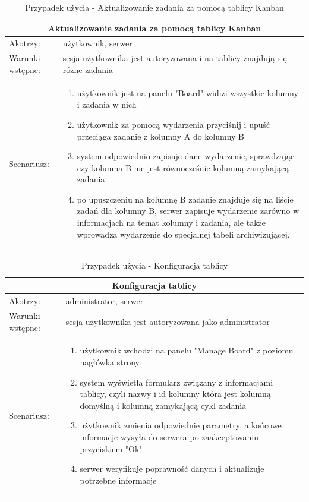 \begin{table}[h!]
	\begin{tabular}{|p{2cm}||p{13cm}|  }
		
		
		
		\hline
		\multicolumn{2}{|c|}{Aktualizowanie zadania za pomocą tablicy Kanban} \\
		\hline
		Akotrzy: & użytkownik, serwer \\
		\hline
		Warunki wstępne: & sesja użytkownika jest autoryzowana i na tablicy znajdują się różne zadania \\
		\hline
		Scenariusz: &
		\begin{enumerate}
			\item użytkownik jest na panelu "Board" widizi wszystkie kolumny i zadania w nich
			\item użytkownik za pomocą wydarzenia przyciśnij i upuść przeciąga zadanie z kolumny A do kolumny B
			\item system odpowiednio zapisuje dane wydarzenie, sprawdzając czy kolumna B nie jest równocześnie kolumną zamykającą zadania
			\item  po upuszczeniu na kolumnę B zadanie znajduje się na liście zadań dla kolumny B, serwer zapisuje wydarzenie zarówno w informacjach na temat kolumny i zadania, ale także wprowadza wydarzenie do specjalnej tabeli archiwizującej.
		\end{enumerate}\\
		\hline
	\end{tabular}
	\caption{Przypadek użycia - Aktualizowanie zadania za pomocą tablicy Kanban}
\end{table}


\begin{table}[h!]
	\begin{tabular}{|p{2cm}||p{13cm}|  }
		
		
		
		\hline
		\multicolumn{2}{|c|}{Konfiguracja tablicy} \\
		\hline
		Akotrzy: & administrator, serwer \\
		\hline
		Warunki wstępne: & sesja użytkownika jest autoryzowana jako administrator  \\
		\hline
		Scenariusz: &
		\begin{enumerate}
			\item użytkownik wchodzi na panelu "Manage Board" z poziomu nagłówka strony 
			\item system wyświetla formularz związany z informacjami tablicy, czyli nazwy i id kolumny która jest kolumną domyślną i kolumną zamykającą cykl zadania
			\item  użytkownik zmienia odpowiednie parametry, a końcowe informacje wysyła do serwera po zaakceptowaniu przyciskiem "Ok"
			\item serwer weryfikuje poprawność danych i aktualizuje potrzebne informacje
		\end{enumerate}\\
		\hline
	\end{tabular}
	\caption{Przypadek użycia - Konfiguracja tablicy}
\end{table}



